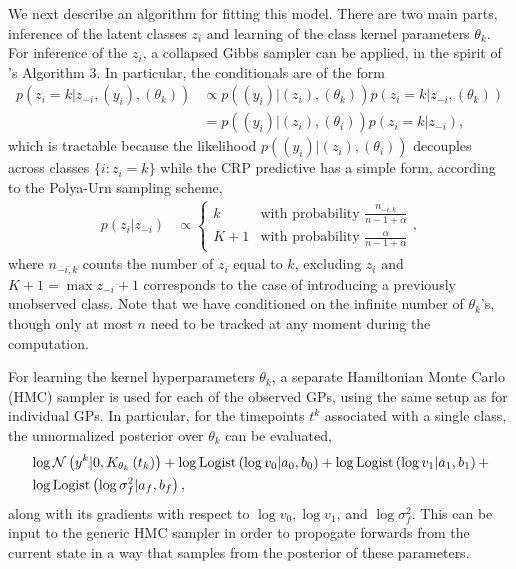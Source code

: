 \documentclass[14pt]{extarticle}
\begin{document}
We next describe an algorithm for fitting this model. There are two main parts,
inference of the latent classes $z_i$ and learning of the class kernel
parameters $\theta_k$. For inference of the $z_i$, a collapsed Gibbs sampler can
be applied, in the spirit of \cite{neal2000markov}'s Algorithm 3. In
particular, the conditionals are of the form
\begin{align}
  p\left(z_i = k \vert z_{-i}, \left(y_i\right), \left(\theta_k\right)\right) &\propto p\left(\left(y_i\right) \vert \left(z_i\right),  \left(\theta_k\right)\right)
  p\left(z_i = k \vert z_{-i}, \left(\theta_k\right)\right) \nonumber \\
  &= p\left(\left(y_i\right) \vert \left(z_i\right), \left(\theta_i\right)\right)p\left(z_i = k \vert z_{-i}\right), \label{eq:igp_conditional}
\end{align}
which is tractable because the likelihood $p\left(\left(y_i\right) \vert
\left(z_i\right), \left(\theta_i\right)\right)$ decouples across classes $\{i :
z_i = k\}$ while the CRP predictive has a simple form, according to the
Polya-Urn sampling scheme,
\begin{align*}
  p\left(z_i\vert z_{-i}\right) &\propto \begin{cases}
    k &\text{with probability } \frac{n_{-i, k}}{n - 1 + \alpha} \\
    K + 1 &\text{with probability } \frac{\alpha}{n - 1 + \alpha}
    \end{cases},
\end{align*}
where $n_{-i, k}$ counts the number of $z_i$ equal to $k$, excluding $z_i$ and
$K + 1 = \max{z_{-i}} + 1$ corresponds to the case of introducing a previously
unobserved class. Note that we have conditioned on the infinite number of
$\theta_k$'s, though only at most $n$ need to be tracked at any moment during
the computation.

For learning the kernel hyperparameters $\theta_k$, a separate Hamiltonian Monte
Carlo (HMC) sampler is used for each of the observed GPs, using the same setup
as \cite{rasmussen2006gaussian} for individual GPs. In particular, for the
timepoints $t^k$ associated with a single class, the unnormalized posterior over
$\theta_k$ can be evaluated,
\begin{align*}
  &\log \mathcal{N}\left(y^k \vert 0, K_{\theta_k}\left(t_k\right)\right) +
  \log \text{Logist}\left(\log v_0 \vert a_0, b_0\right) +
  \log \text{Logist}\left(\log v_1 \vert a_1, b_1\right) +\\
  &\log \text{Logist}\left(\log \sigma_f^2 \vert a_f, b_f\right),
\end{align*}
along with its gradients with respect to $\log v_0, \log v_1$, and $\log
\sigma_f^2$. This can be input to the generic HMC sampler in order to propogate
forwards from the current state in a way that samples from the posterior of
these parameters.
\end{document}

